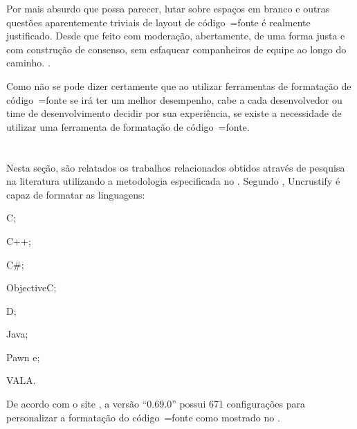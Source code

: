%
\begin{citacao}
    Por mais absurdo que possa parecer,
    lutar sobre espaços em branco e
    outras questões aparentemente triviais de layout de código~=fonte é realmente justificado.
    Desde que feito com moderação,
    abertamente,
    de uma forma justa e
    com construção de consenso,
    sem esfaquear companheiros de equipe ao longo do caminho.
    \cite[tradução nossa\protect\footnotemark]{deathToTheSpaceInfidels}.
\end{citacao}

Como não se pode dizer certamente que ao utilizar ferramentas de formatação de código~=fonte se irá ter um melhor desempenho,
cabe a cada desenvolvedor ou
time de desenvolvimento decidir por sua experiência,
se existe a necessidade de utilizar uma ferramenta de formatação de código~=fonte.


\section{}
\label{section:trabalhosRelacionados}

Nesta seção,
são relatados os trabalhos relacionados obtidos através de pesquisa na literatura utilizando a metodologia especificada no .
Segundo ,
Uncrustify é capaz de formatar as linguagens:
\begin{inparaenum}[1)]
\item C;
\item C++;
\item C\#;
\item ObjectiveC;
\item D;
\item Java;
\item Pawn e;
\item VALA.
\end{inparaenum}%
De acordo com o site ,
a versão ``0.69.0'' possui 671 configurações para personalizar a formatação do código~=fonte como mostrado no .

